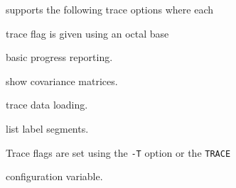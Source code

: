 









 supports the following trace options where each


trace flag is given using an octal base


\begin{optlist}


    basic progress reporting.


    show covariance matrices.


    trace data loading.


    list label segments.


\end{optlist}


Trace flags are set using the \texttt{-T} option or the  \texttt{TRACE} 


configuration variable.


















